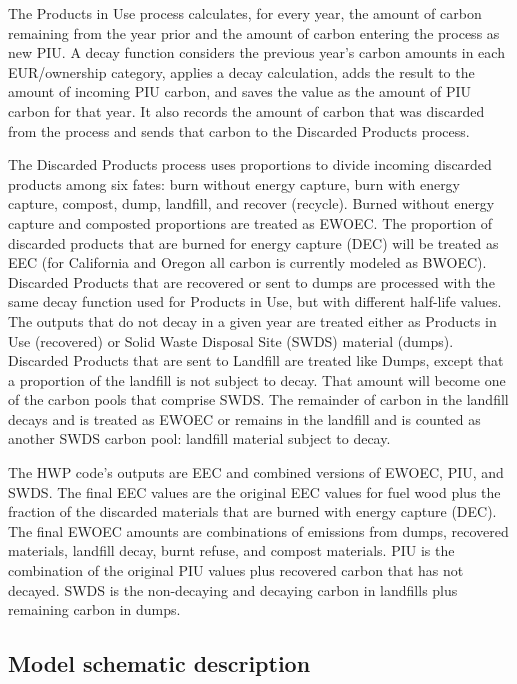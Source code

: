 \documentclass[
  openany]{book}
\begin{document}
The Products in Use process calculates, for every year, the amount of
carbon remaining from the year prior and the amount of carbon entering
the process as new PIU. A decay function considers the previous year's
carbon amounts in each EUR/ownership category, applies a decay
calculation, adds the result to the amount of incoming PIU carbon, and
saves the value as the amount of PIU carbon for that year. It also
records the amount of carbon that was discarded from the process and
sends that carbon to the Discarded Products process.

The Discarded Products process uses proportions to divide incoming
discarded products among six fates: burn without energy capture, burn
with energy capture, compost, dump, landfill, and recover (recycle).
Burned without energy capture and composted proportions are treated as
EWOEC. The proportion of discarded products that are burned for energy
capture (DEC) will be treated as EEC (for California and Oregon all
carbon is currently modeled as BWOEC). Discarded Products that are
recovered or sent to dumps are processed with the same decay function
used for Products in Use, but with different half-life values. The
outputs that do not decay in a given year are treated either as Products
in Use (recovered) or Solid Waste Disposal Site (SWDS) material (dumps).
Discarded Products that are sent to Landfill are treated like Dumps,
except that a proportion of the landfill is not subject to decay. That
amount will become one of the carbon pools that comprise SWDS. The
remainder of carbon in the landfill decays and is treated as EWOEC or
remains in the landfill and is counted as another SWDS carbon pool:
landfill material subject to decay.

The HWP code's outputs are EEC and combined versions of EWOEC, PIU, and
SWDS. The final EEC values are the original EEC values for fuel wood
plus the fraction of the discarded materials that are burned with energy
capture (DEC). The final EWOEC amounts are combinations of emissions
from dumps, recovered materials, landfill decay, burnt refuse, and
compost materials. PIU is the combination of the original PIU values
plus recovered carbon that has not decayed. SWDS is the non-decaying and
decaying carbon in landfills plus remaining carbon in dumps.

\hypertarget{model-func-schdesc}{%
\subsection{Model schematic description}\label{model-func-schdesc}}
\end{document}

